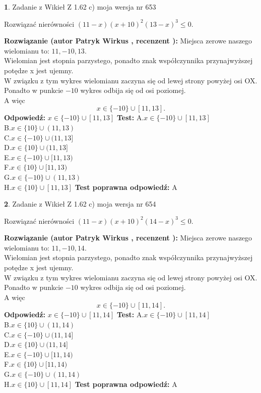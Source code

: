 \documentclass[12pt, a4paper]{article}
\theoremstyle{definition} %
\newtheorem{zad}{}
\newcommand{\zadStart}[1]{\begin{zad}#1\newline}
\newcommand{\zadStop}{\end{zad}}
\newcommand{\rozwStart}[2]{\noindent \textbf{Rozwiązanie (autor #1 , recenzent #2): }\newline}
\newcommand{\rozwStop}{\newline}
\newcommand{\odpStart}{\noindent \textbf{Odpowiedź:}\newline}
\newcommand{\odpStop}{\newline}
\newcommand{\testStart}{\noindent \textbf{Test:}\newline}
\newcommand{\testStop}{\newline}
\newcommand{\kluczStart}{\noindent \textbf{Test poprawna odpowiedź:}\newline}
\newcommand{\kluczStop}{\newline}
\begin{document}
\zadStart{Zadanie z Wikieł Z 1.62 c) moja wersja nr 653}

Rozwiązać nierówności $(11-x)(x+10)^{2}(13-x)^{3}\le0$.
\zadStop
\rozwStart{Patryk Wirkus}{}
Miejsca zerowe naszego wielomianu to: $11, -10, 13$.\\
Wielomian jest stopnia parzystego, ponadto znak współczynnika przy\linebreak najwyższej potędze x jest ujemny.\\ W związku z tym wykres wielomianu zaczyna się od lewej strony powyżej osi OX.\\
Ponadto w punkcie $-10$ wykres odbija się od osi poziomej.\\
A więc $$x \in \{-10\} \cup [11,13].$$
\rozwStop
\odpStart
$x \in \{-10\} \cup [11,13]$
\odpStop
\testStart
A.$x \in \{-10\} \cup [11,13]$\\
B.$x \in \{10\} \cup (11,13)$\\
C.$x \in \{-10\} \cup (11,13]$\\
D.$x \in \{10\} \cup (11,13]$\\
E.$x \in \{-10\} \cup [11,13)$\\
F.$x \in \{10\} \cup [11,13)$\\
G.$x \in \{-10\} \cup (11,13)$\\
H.$x \in \{10\} \cup [11,13]$
\testStop
\kluczStart
A
\kluczStop



\zadStart{Zadanie z Wikieł Z 1.62 c) moja wersja nr 654}

Rozwiązać nierówności $(11-x)(x+10)^{2}(14-x)^{3}\le0$.
\zadStop
\rozwStart{Patryk Wirkus}{}
Miejsca zerowe naszego wielomianu to: $11, -10, 14$.\\
Wielomian jest stopnia parzystego, ponadto znak współczynnika przy\linebreak najwyższej potędze x jest ujemny.\\ W związku z tym wykres wielomianu zaczyna się od lewej strony powyżej osi OX.\\
Ponadto w punkcie $-10$ wykres odbija się od osi poziomej.\\
A więc $$x \in \{-10\} \cup [11,14].$$
\rozwStop
\odpStart
$x \in \{-10\} \cup [11,14]$
\odpStop
\testStart
A.$x \in \{-10\} \cup [11,14]$\\
B.$x \in \{10\} \cup (11,14)$\\
C.$x \in \{-10\} \cup (11,14]$\\
D.$x \in \{10\} \cup (11,14]$\\
E.$x \in \{-10\} \cup [11,14)$\\
F.$x \in \{10\} \cup [11,14)$\\
G.$x \in \{-10\} \cup (11,14)$\\
H.$x \in \{10\} \cup [11,14]$
\testStop
\kluczStart
A
\kluczStop
\end{document}
